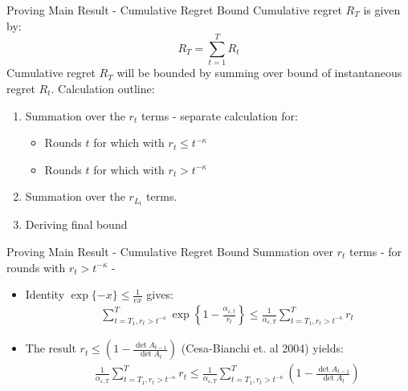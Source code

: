 \documentclass{beamer}
\begin{document}
\begin{frame}{Proving Main Result - Cumulative Regret Bound}
Cumulative regret $R_T$ is given by:
\begin{equation*}
R_T=\sum\limits_{t=1}^{T}R_t
\label{cum_reg_define}
\end{equation*}
Cumulative regret $R_T$ will be bounded by summing over bound of instantaneous regret $R_t$. \newline\newline Calculation outline:\newline
\begin{enumerate}
\item Summation over the $r_t$ terms - separate calculation for:
\begin{itemize}
\item Rounds $t$ for which with $r_t\leq t^{-\kappa}$
\item Rounds $t$ for which with $r_t> t^{-\kappa}$
\end{itemize}
\item Summation over the $r_{L_t}$ terms.
\item Deriving final bound
\end{enumerate}
\end{frame}

\begin{frame}{Proving Main Result - Cumulative Regret Bound}
Summation over $r_t$ terms - for rounds with $r_t> t^{-\kappa}$ - \newline
\begin{itemize}
\item Identity $\exp\{-x\}\leq\frac{1}{ex}$ gives:
\begin{eqnarray*}
&&\sum\limits_{t=T_1,r_t> t^{-\kappa}}^{T}\exp\left\{1-\frac{\alpha_{\varepsilon,t}}{r_t}\right\}\leq \frac{1}{\alpha_{\varepsilon,T}}\sum\limits_{t=T_1,r_t> t^{-\kappa}}^{T}r_t\nonumber
\end{eqnarray*}
\item The result $ r_t\leq\left(1-\frac{\det{A_{t-1}}}{\det{A_t}}\right)$ (Cesa-Bianchi et. al 2004) yields:
\begin{eqnarray*}
&&\frac{1}{\alpha_{\varepsilon,T}}\sum\limits_{t=T_1,r_t> t^{-\kappa}}^{T}r_t\leq\frac{1}{\alpha_{\varepsilon,T}}\sum\limits_{t=T_1,r_t> t^{-\kappa}}^{T}\left(1-\frac{\det{A_{t-1}}}{\det{A_t}}\right)\nonumber
\end{eqnarray*}
\end{itemize}
\end{frame}
\end{document}

